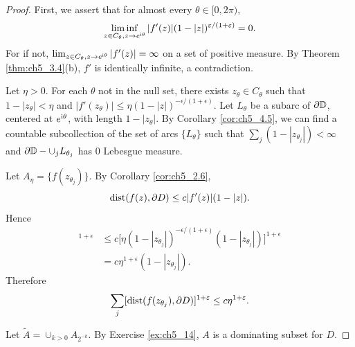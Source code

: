 \begin{proof}
First, we assert that for almost every $\theta \in [0,2\pi)$,
\begin{equation}\label{eq:ch5_4.18}
    \liminf_{z\in C_\theta,z\to e^{\mathrm{i}\theta}} |f'(z)|(1-|z|)^{\varepsilon/(1+\varepsilon)} = 0.
\end{equation}
For if not, $\lim_{z\in C_\theta,z\to e^{\mathrm{i}\theta}} |f'(z)| = \infty$ on a set of positive measure. By The\-orem \ref{thm:ch5_3.4}(b), $f'$ is identically infinite, a contradiction.

Let $\eta > 0$. For each $\theta$ not in the null set, there exists $z_\theta \in C_\theta$ such that $1-|z_\theta| < \eta$ and $|f'(z_\theta)| \leq \eta(1-|z|)^{-\epsilon/(1+\epsilon)}$. Let $L_\theta$ be a subarc of $\partial\mathbb{D}$, centered at $e^{\mathrm{i}\theta}$, with length $1-|z_\theta|$. By Corollary \ref{cor:ch5_4.5}, we can find a countable subcollection of the set of arcs $\{L_\theta\}$ such that $\sum_j(1-|z_{\theta_j}|) < \infty$ and $\partial\mathbb{D} - \cup_j L_{\theta_j}$ has $0$ Lebesgue measure.

Let $A_\eta = \{f(z_{\theta_j})\}$. By Corollary \ref{cor:ch5_2.6},
\[
    \operatorname{dist}(f(z),\partial D) \leq c|f'(z)|(1-|z|).
\]
Hence
\begin{align*}
    [\dist(f(z_{\theta_j}),\partial D)]^{1+\epsilon} &\leq c\big[\eta(1-|z_{\theta_j}|)^{-\epsilon/(1+\epsilon)}(1-|z_{\theta_j}|)\big]^{1+\epsilon} \\
    &= c\eta^{1+\epsilon}(1-|z_{\theta_j}|).
\end{align*}
Therefore
\[
    \sum_j[\operatorname{dist}(f(z_{\theta_j}),\partial D)]^{1+\varepsilon} \leq c\eta^{1+\varepsilon}.
\]

Let $\widetilde{A} = \cup_{k>0}A_{2^{-k}}$. By Exercise \ref{ex:ch5_14}, $A$ is a dominating subset for $D$.
\end{proof}

